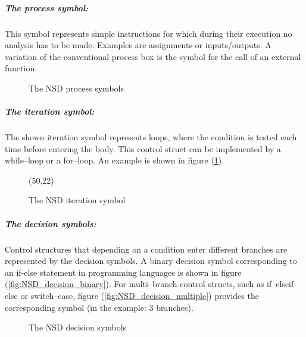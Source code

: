 \documentclass{report}
\begin{document}
\subparagraph{The process symbol:}

This symbol represents simple instructions for which during their execution no analysis has to be made. Examples are assignments or inputs/outputs. 
A variation of the conventional process box is the symbol for the call of an external function.
\begin{figure}
\centering
{}
\caption{The NSD process symbols }
\end{figure}

\subparagraph{The iteration symbol:}
The shown iteration symbol represents loops, where the condition is tested each time before entering the body. This control struct can be implemented by a while--loop or a for--loop. An example is shown in figure (\ref{NSD_whileLoop}).

\begin{figure}[H]
\centering
\label{NSD_whileLoop}
\begin{struktogramm}(50,22)
\whileend
\end{struktogramm}

\caption{The NSD iteration symbol}
\end{figure}

\subparagraph{The decision symbols:}
Control structures that depending on a condition enter different branches are represented by the decision symbols. A binary decision symbol corresponding to an if-else statement in programming languages is shown in figure (\ref{fig:NSD_decision_binary}). For multi--branch control structs, such as if--elseif--else or switch--case, figure (\ref{fig:NSD_decision_multiple}) provides the corresponding symbol (in the example: 3 branches).
 
\begin{figure}[H]
\centering
{}
\caption{The NSD decision symbols }
\end{figure}
\end{document}
